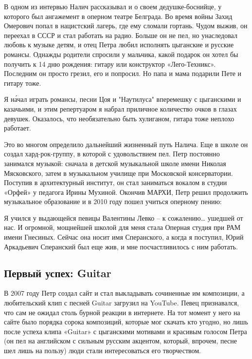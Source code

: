 В одном из интервью Налич рассказывал и о своем дедушке-боснийце, у которого был ангажемент в оперном театре Белграда. Во время войны Захид Омерович попал в нацистский лагерь, где ему сломали гортань. Чудом выжив, он переехал в СССР и стал работать на радио. Больше он не пел, но унаследовал любовь к музыке детям, и отец Петра любил исполнять цыганские и русские романсы. Однажды родители спросили у мальчика, какой подарок он хотел бы получить к 14 дню рождения: гитару или конструктор «Лего-Техникс». Последним он просто грезил, его и попросил. Но папа и мама подарили Пете и гитару тоже.

\begin{fancyquotes}
    Я н\'{а}чал играть романсы, песни Цоя и "Наутилуса" вперемешку с цыганскими и казачьими, и этим репертуаром я набрал приличное количество очков в глазах девушек. Оказалось, что необязательно быть хулиганом, гитара тоже неплохо работает.
\end{fancyquotes}

Это во многом определило дальнейший жизненный путь Налича. Еще в школе он создал хард-рок-группу, в которой с удовольствием пел. Петр постоянно занимался музыкой: сначала в детской музыкальной школе имени Николая Мясковского, затем в музыкальном училище при Московской консерватории. Поступив в архитектурный институт, он стал заниматься вокалом в студии «Орфей» у педагога Ирины Мухиной. Окончив МАРХИ, Петр решил продолжить музыкальное образование и в 2010 году пошел учиться оперному пению:

\begin{fancyquotes}
    Я учился у выдающейся певицы Валентины Левко – к сожалению… ушедшей от нас. И огромной, мощнейшей школой для меня стала Оперная студия при РАМ имени Гнесиных. Сейчас она носит имя Сперанского, а когда я поступил, Юрий Аркадьевич Сперанский был еще жив, и мне посчастливилось с ним работать.
\end{fancyquotes}


\subsection{Первый успех: Guitar}
В 2007 году Петр создал сайт и стал выкладывать сочиненные им композиции, а любительский клип с песней Guitar загрузил на YouTube. Певец признавался, что сам не ожидал столь бурной реакции в интернете. На тот момент у него на сайте было порядка сорока композиций, которые мог скачать кто угодно, но лишь после успеха клипа «Guitar» с цыганскими мотивами и красивым голосом Петра (он пел на английском с сильным русским акцентом, который, впрочем, песне шел лишь на пользу) люди стали интересоваться его творчеством.

